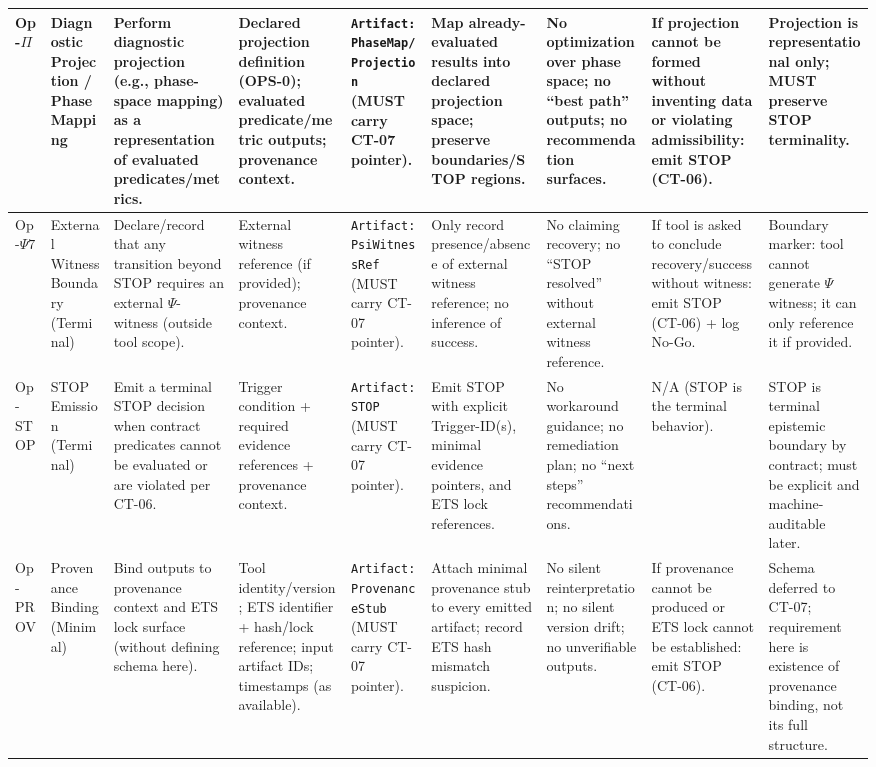 \begin{longtable}{|p{1.7cm}|p{2.2cm}|p{3.0cm}|p{3.0cm}|p{3.2cm}|p{3.0cm}|p{3.0cm}|p{3.0cm}|p{2.6cm}|}
Op-$\Pi$ &
Diagnostic Projection / Phase Mapping &
Perform diagnostic projection (e.g., phase-space mapping) as a representation of evaluated predicates/metrics. &
Declared projection definition (OPS-0); evaluated predicate/metric outputs; provenance context. &
\texttt{Artifact:PhaseMap/Projection} (MUST carry CT-07 pointer). &
Map already-evaluated results into declared projection space; preserve boundaries/STOP regions. &
No optimization over phase space; no ``best path'' outputs; no recommendation surfaces. &
If projection cannot be formed without inventing data or violating admissibility: emit STOP (CT-06). &
Projection is representational only; MUST preserve STOP terminality. \\
\hline

Op-$\Psi7$ &
External Witness Boundary (Terminal) &
Declare/record that any transition beyond STOP requires an external $\Psi$-witness (outside tool scope). &
External witness reference (if provided); provenance context. &
\texttt{Artifact:PsiWitnessRef} (MUST carry CT-07 pointer). &
Only record presence/absence of external witness reference; no inference of success. &
No claiming recovery; no ``STOP resolved'' without external witness reference. &
If tool is asked to conclude recovery/success without witness: emit STOP (CT-06) + log No-Go. &
Boundary marker: tool cannot generate $\Psi$ witness; it can only reference it if provided. \\
\hline

Op-STOP &
STOP Emission (Terminal) &
Emit a terminal STOP decision when contract predicates cannot be evaluated or are violated per CT-06. &
Trigger condition + required evidence references + provenance context. &
\texttt{Artifact:STOP} (MUST carry CT-07 pointer). &
Emit STOP with explicit Trigger-ID(s), minimal evidence pointers, and ETS lock references. &
No workaround guidance; no remediation plan; no ``next steps'' recommendations. &
N/A (STOP is the terminal behavior). &
STOP is terminal epistemic boundary by contract; must be explicit and machine-auditable later. \\
\hline

Op-PROV &
Provenance Binding (Minimal) &
Bind outputs to provenance context and ETS lock surface (without defining schema here). &
Tool identity/version; ETS identifier + hash/lock reference; input artifact IDs; timestamps (as available). &
\texttt{Artifact:ProvenanceStub} (MUST carry CT-07 pointer). &
Attach minimal provenance stub to every emitted artifact; record ETS hash mismatch suspicion. &
No silent reinterpretation; no silent version drift; no unverifiable outputs. &
If provenance cannot be produced or ETS lock cannot be established: emit STOP (CT-06). &
Schema deferred to CT-07; requirement here is existence of provenance binding, not its full structure. \\
\hline

\end{longtable}
\endgroup

